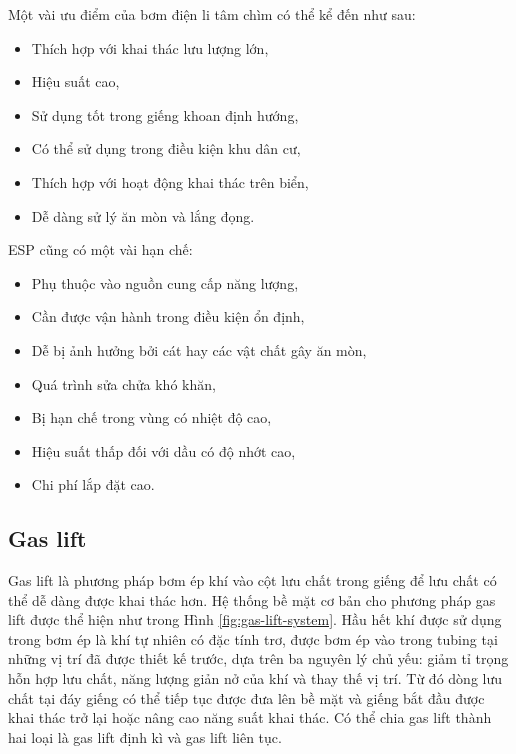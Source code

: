 \documentclass[12pt,a4paper]{report}
\begin{document}
Một vài ưu điểm của bơm điện li tâm chìm có thể kể đến như sau:
	\begin{itemize}
		\item Thích hợp với khai thác lưu lượng lớn,
		\item Hiệu suất cao,
		\item Sử dụng tốt trong giếng khoan định hướng,
		\item Có thể sử dụng trong điều kiện khu dân cư,
		\item Thích hợp với hoạt động khai thác trên biển,
		\item Dễ dàng sử lý ăn mòn và lắng đọng.
	\end{itemize}
ESP cũng có một vài hạn chế:
	\begin{itemize}
		\item Phụ thuộc vào nguồn cung cấp năng lượng,
		\item Cần được vận hành trong điều kiện ổn định,
		\item Dễ bị ảnh hưởng bởi cát hay các vật chất gây ăn mòn,
		\item Quá trình sửa chửa khó khăn,
		\item Bị hạn chế trong vùng có nhiệt độ cao,
		\item Hiệu suất thấp đối với dầu có độ nhớt cao,
		\item Chi phí lắp đặt cao.\\
	\end{itemize}

\subsection{Gas lift}
Gas lift là phương pháp bơm ép khí vào cột lưu chất trong giếng để lưu chất có thể dễ dàng được khai thác hơn. Hệ thống bề mặt cơ bản cho phương pháp gas lift được thể hiện như trong Hình \ref{fig:gas-lift-system}. Hầu hết khí được sử dụng trong bơm ép là khí tự nhiên có đặc tính trơ, được bơm ép vào trong tubing tại những vị trí đã được thiết kế trước, dựa trên ba nguyên lý chủ yếu: giảm tỉ trọng hỗn hợp lưu chất, năng lượng giản nở của khí và thay thế vị trí. Từ đó dòng lưu chất tại đáy giếng có thể tiếp tục được đưa lên bề mặt và giếng bắt đầu được khai thác trở lại hoặc nâng cao năng suất khai thác. Có thể chia gas lift thành hai loại là gas lift định kì và gas lift liên tục.
\end{document}
